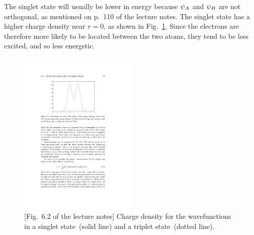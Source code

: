 {	The singlet state will usually be lower in energy because $\psi_A$ and $\psi_B$ are not orthogonal, as mentioned on p.~110 of the lecture notes.  The singlet state has a higher charge density near $r = 0$, as shown in Fig.~\ref{f1}.  Since the electrons are therefore more likely to be located between the two atoms, they tend to be less excited, and so less energetic.
	
	\begin{figure}[t] \centering
		\includegraphics[width=0.5\textwidth,trim=5cm 19cm 7cm 4.5cm,clip]{6-2}
		\caption{[Fig.~6.2 of the lecture notes] Charge density for the wavefunctions in a singlet state~(solid line) and a triplet state~(dotted line).}
		\label{f1}
	\end{figure}
}